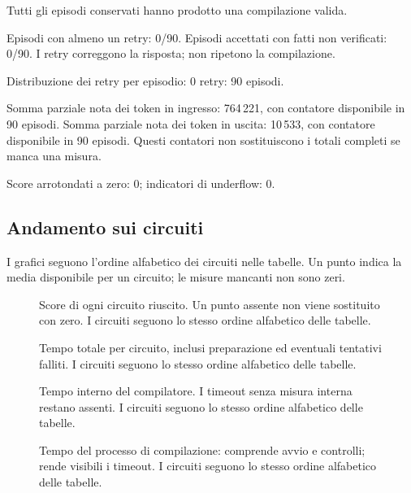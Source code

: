 Tutti gli episodi conservati hanno prodotto una compilazione valida.

Episodi con almeno un retry: 0/90. Episodi accettati con fatti non verificati: 0/90. I retry correggono la risposta; non ripetono la compilazione.

Distribuzione dei retry per episodio: 0 retry: 90 episodi.

Somma parziale nota dei token in ingresso: 764\,221, con contatore disponibile in 90 episodi. Somma parziale nota dei token in uscita: 10\,533, con contatore disponibile in 90 episodi. Questi contatori non sostituiscono i totali completi se manca una misura.

Score arrotondati a zero: 0; indicatori di underflow: 0.
\subsection{Andamento sui circuiti}
I grafici seguono l’ordine alfabetico dei circuiti nelle tabelle. Un punto indica la media disponibile per un circuito; le misure mancanti non sono zeri.

\begin{figure}[!htbp]\centering

\caption{Score di ogni circuito riuscito. Un punto assente non viene sostituito con zero. I circuiti seguono lo stesso ordine alfabetico delle tabelle.}
\end{figure}

\begin{figure}[!htbp]\centering

\caption{Tempo totale per circuito, inclusi preparazione ed eventuali tentativi falliti. I circuiti seguono lo stesso ordine alfabetico delle tabelle.}
\end{figure}

\begin{figure}[!htbp]\centering

\caption{Tempo interno del compilatore. I timeout senza misura interna restano assenti. I circuiti seguono lo stesso ordine alfabetico delle tabelle.}
\end{figure}

\begin{figure}[!htbp]\centering

\caption{Tempo del processo di compilazione: comprende avvio e controlli; rende visibili i timeout. I circuiti seguono lo stesso ordine alfabetico delle tabelle.}
\end{figure}

